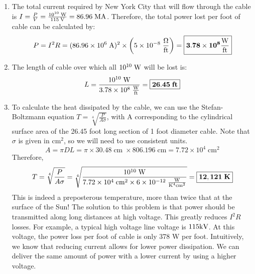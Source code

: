 \documentclass{article}
\begin{document}
    \begin{enumerate}
        \item
        The total current required by New York City that will flow through the
            cable is $I = \frac{P}{V} = \frac{10^{10}\;\text{W}}{115\;\text{V}} = 86.96\;\text{M}\text{A}$. Therefore, the total power lost per foot of cable can be calculated by:
        \[P = I^2R = (86.96 \times 10^6\;\text{A})^2 \times \left(5\times10^{-8}\;\frac{\Omega}{\text{ft}}\right) = \boxed{\mathbf{3.78\times10^{8} \frac{\text{W}}{\text{ft}}}} \] 
        \item
        The length of cable over which all $10^{10}\;\text{W}$ will be lost is:
        \[L = \frac{10^{10}\;\text{W}}{3.78 \times 10^{8}\;\frac{\text{W}}{\text{ft}}} = \boxed{\mathbf{26.45\;ft}}\]
        \item
        To calculate the heat dissipated by the cable, we can use the Stefan-Boltzmann equation $T = \sqrt[4]{\frac{P}{A\sigma}}$, with A corresponding to the cylindrical surface area of the 26.45 foot long section of 1 foot diameter cable. Note that $\sigma$ is given in cm$^2$, so we will need to use consistent units.
        \[A = \pi DL = \pi \times 30.48\;{\ensuremath{\text{cm}}}\;\times 806.196\;{\ensuremath{\text{cm}}} = 7.72 \times 10^4\;{\ensuremath{\text{cm}}}^2\]
        Therefore,
        \[T = \sqrt[4]{\frac{P}{A\sigma}} = \sqrt[4]{\frac{10^{10}\;\text{W}}{7.72 \times 10^4\;{\text{cm}}^2 \times 6 \times 10^{-12}\;\frac{\text{W}}{\text{K}^4\text{cm}^2}}} = \boxed{\mathbf{12,121\;K}} \]
        This is indeed a preposterous temperature, more than twice that at the surface of the Sun! The solution to this problem is that power should be transmitted along long distances at high voltage. This greatly reduces $I^2R$ losses. For example, a typical high voltage line voltage is $115 \text{k}\text{V}$. At this voltage, the power loss per foot of cable is only 378 W per foot. Intuitively, we know that reducing current allows for lower power dissipation. We can deliver the same amount of power with a lower current by using a higher voltage.
    \end{enumerate}
\end{document}
